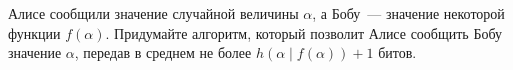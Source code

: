 Алисе сообщили значение случайной величины $\alpha$, а Бобу~--- значение некоторой функции
$f(\alpha)$. Придумайте алгоритм, который позволит Алисе сообщить Бобу значение $\alpha$, передав в
среднем не более $h(\alpha \mid f(\alpha)) + 1$ битов.
